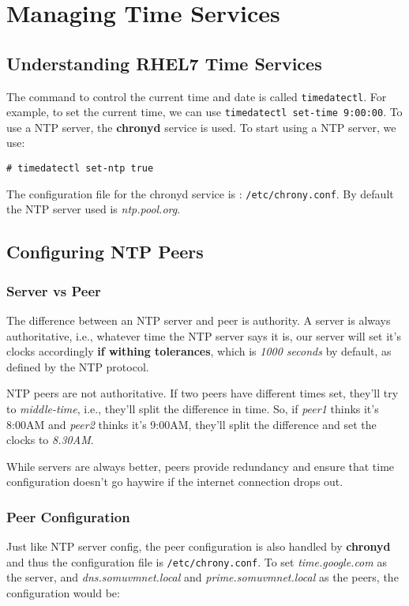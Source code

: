 \chapter{Managing Time Services}
	
\section{Understanding RHEL7 Time Services}
The command to control the current time and date is called \verb|timedatectl|. For example, to set the current time, we can use \verb|timedatectl set-time 9:00:00|. To use a NTP server, the \textbf{chronyd} service is used. To start using a NTP server, we use:

\vspace{-15pt}
\begin{verbatim}
# timedatectl set-ntp true
\end{verbatim}
\vspace{-10pt}	

\noindent
The configuration file for the chronyd service is : \verb|/etc/chrony.conf|. By default the NTP server used is \textit{ntp.pool.org}. 

\section{Configuring NTP Peers}
\subsection{Server vs Peer}
The difference between an NTP server and peer is authority. A server is always authoritative, i.e., whatever time the NTP server says it is, our server will set it's clocks accordingly \textbf{if withing tolerances}, which is \textit{1000 seconds} by default, as defined by the NTP protocol. 

NTP peers are not authoritative. If two peers have different times set, they'll try to \textit{middle-time}, i.e., they'll split the difference in time. So, if \textit{peer1} thinks it's 8:00AM and \textit{peer2} thinks it's 9:00AM, they'll split the difference and set the clocks to \textit{8.30AM}. 

While servers are always better, peers provide redundancy and ensure that time configuration doesn't go haywire if the internet connection drops out.

\vspace{-10pt}
\subsection{Peer Configuration}
Just like NTP server config, the peer configuration is also handled by \textbf{chronyd} and thus the configuration file is \verb|/etc/chrony.conf|. To set \textit{time.google.com} as the server, and \textit{dns.somuvmnet.local} and \textit{prime.somuvmnet.local} as the peers, the configuration would be:

